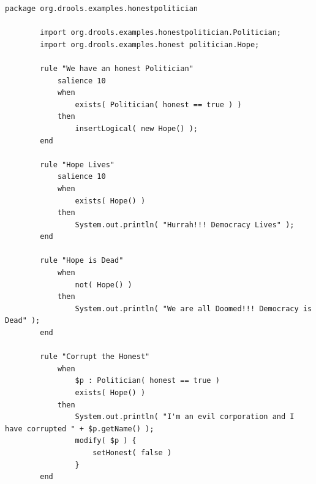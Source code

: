 \noindent\begin{minipage}{\textwidth}
    \begin{lstlisting}[language={[drl]Drools}, caption=Example Drools file., captionpos=b, label=listing:drl_file]
        package org.drools.examples.honestpolitician
    
        import org.drools.examples.honestpolitician.Politician;
        import org.drools.examples.honest politician.Hope;
        
        rule "We have an honest Politician"
            salience 10
            when
                exists( Politician( honest == true ) )
            then
                insertLogical( new Hope() );
        end
        
        rule "Hope Lives"
            salience 10
            when
                exists( Hope() )
            then
                System.out.println( "Hurrah!!! Democracy Lives" );
        end
        
        rule "Hope is Dead"
            when
                not( Hope() )
            then
                System.out.println( "We are all Doomed!!! Democracy is Dead" );
        end
        
        rule "Corrupt the Honest"
            when
                $p : Politician( honest == true )   
                exists( Hope() )
            then
                System.out.println( "I'm an evil corporation and I have corrupted " + $p.getName() );
                modify( $p ) { 
                    setHonest( false ) 
                }
        end
    \end{lstlisting}
\end{minipage}

